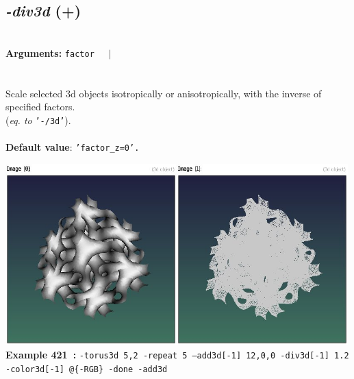 \documentclass[a4paper,11pt,twoside]{book}
\begin{document}
\subsection{\emph{-div3d} (+)}\vspace*{-0.5em}
~\\\textbf{Arguments: } 
{\small \texttt{factor}}~~~$|$\\
\\~\\
Scale selected 3d objects isotropically or anisotropically, with the inverse of specified
factors.
~\\(\emph{eq. to} {\small \texttt{'-/3d'}}).
~\\~\\\textbf{Default value}: {\small \texttt{'factor\_z=0'.}}
\begin{center}\includegraphics[keepaspectratio=true,height=7cm,width=\textwidth]{img/gmic_def421.jpg}\\
{\footnotesize \textbf{Example 421~:} \texttt{-torus3d 5,2 -repeat 5 --add3d[-1] 12,0,0 -div3d[-1] 1.2 -color3d[-1] @\{-RGB\} -done -add3d}}
\end{center}
\end{document}

